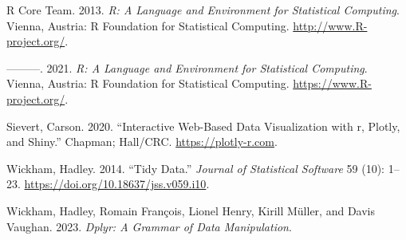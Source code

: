 \begin{CSLReferences}{1}{0}
\leavevmode{}%
R Core Team. 2013. \emph{R: A Language and Environment for Statistical Computing}. Vienna, Austria: R Foundation for Statistical Computing. \url{http://www.R-project.org/}.

\leavevmode{}%
---------. 2021. \emph{R: A Language and Environment for Statistical Computing}. Vienna, Austria: R Foundation for Statistical Computing. \url{https://www.R-project.org/}.

\leavevmode{}%
Sievert, Carson. 2020. {``Interactive {Web-Based} Data Visualization with r, Plotly, and Shiny.''} Chapman; Hall/CRC. \url{https://plotly-r.com}.

\leavevmode{}%
Wickham, Hadley. 2014. {``Tidy Data.''} \emph{Journal of Statistical Software} 59 (10): 1--23. \url{https://doi.org/10.18637/jss.v059.i10}.

\leavevmode{}%
Wickham, Hadley, Romain François, Lionel Henry, Kirill Müller, and Davis Vaughan. 2023. \emph{Dplyr: A Grammar of Data Manipulation}.

\end{CSLReferences}



\address{%
Krisanat Anukarnsakulchularp\\
Monash University\\%
Faculty of Business and Economics\\ Melbourne, Australia\\
%
%
\textit{ORCiD: \href{https://orcid.org/0009-0008-5638-7124}{0009-0008-5638-7124}}\\%
\href{mailto:kanu0003@student.monash.edu}{\nolinkurl{kanu0003@student.monash.edu}}%
}
